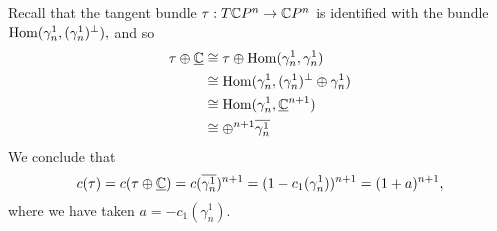 \documentclass{amsart}
\begin{document}
\begin{example}
    Recall that the tangent bundle $\tau:T\mathbb{C} P^n\to\mathbb{C} P^n$ is identified with the bundle
    $\operatorname{Hom}(\gamma_n^1, (\gamma_n^1)^\perp),$ and so
    \begin{align*}
        \tau\oplus \underline{\mathbb{C}} &\cong \tau\oplus\operatorname{Hom}(\gamma_n^1,\gamma_n^1)\\
        &\cong \operatorname{Hom}(\gamma^1_n, (\gamma^1_n)^\perp\oplus \gamma_n^1)\\
        &\cong \operatorname{Hom}(\gamma^1_n, \underline{\mathbb{C}}^{n+1})\\
        &\cong \oplus^{n+1}\overline{\gamma_n^1}
    \end{align*}
    We conclude that
    \begin{equation*}
        c(\tau)=c(\tau\oplus\underline{\mathbb{C}})=c(\overline{\gamma_n^1})^{n+1}=(1-c_1(\gamma_n^1))^{n+1}=(1+a)^{n+1},
    \end{equation*}
    where we have taken $a=-c_1(\gamma_n^1)$.
\end{example}
\end{document}
